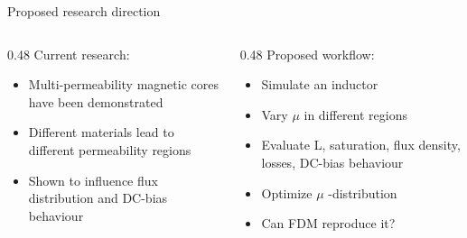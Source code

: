 \begin{frame}{Proposed research direction}


\begin{columns}[c]
    
    \begin{column}{0.48\textwidth}
    Current research:
        \begin{itemize}
            \item Multi-permeability magnetic cores have been demonstrated
            \item Different materials lead to different permeability regions
            \item Shown to influence flux distribution and DC-bias behaviour
        \end{itemize}
    \end{column}

    \begin{column}{0.48\textwidth}
    Proposed workflow:
        \begin{itemize}
        \item Simulate an inductor
        \item Vary $\mu$ in different regions
        \item Evaluate L, saturation, flux density, losses, DC-bias behaviour
        \item Optimize $\mu$ -distribution
        \item Can FDM reproduce it?
        \end{itemize}
    \end{column}

\end{columns}

\end{frame}